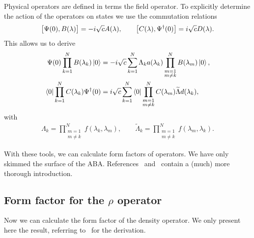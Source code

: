 \documentclass[11pt, a4paper]{report} %
\begin{document}
Physical operators are defined in terms the field operator.
To explicitly determine the action of the operators on states we use the commutation relations
\begin{align}
  \label{eq:47}
  \qty\big[\Psi(0),B(\lambda)] = -i \sqrt{c} A(\lambda), \qquad \qty[C(\lambda), \Psi^{\dag}(0)] = i \sqrt{c} D(\lambda).
\end{align}
This allows us to derive
\begin{align}
  \label{eq:48}
  \Psi(0) \prod_{k=1}^N B(\lambda_k) \ket{0} &= -i\sqrt{c} \sum_{k=1}^N\Lambda_k a(\lambda_k) \prod_{\substack{m=1\\m\neq k}}^N B(\lambda_m) \ket{0},\\
  \bra{0} \prod_{k=1}^N C(\lambda_k) \Psi^{\dag}(0) &= i \sqrt{c} \sum_{k=1}^N \bra{0} \prod_{\substack{m=1\\m\neq k}}^N C(\lambda_m) \widetilde{\Lambda} d(\lambda_k),
\end{align}
with~\cite{Piroli2015}
\begin{align}
  \label{eq:49}
  \Lambda_k = \prod_{\substack{m=1\\m\neq k}}^N f(\lambda_k,\lambda_m), \qquad \widetilde{\Lambda}_k = \prod_{\substack{m=1\\m\neq k}}^N f(\lambda_m,\lambda_k).
\end{align}

With these tools, we can calculate form factors of operators.
We have only skimmed the surface of the ABA.\@
References~\cite{Korepin1993} and~\cite{slavnov18_algeb_bethe_ansat} contain a (much) more thorough introduction.


\subsection{Form factor for the \(\rho\) operator}

Now we can calculate the form factor of the density operator.
We only present here the result, referring to~\cite{slavnov90_noneq_time_curren_correl_funct} for the derivation.
\end{document}
